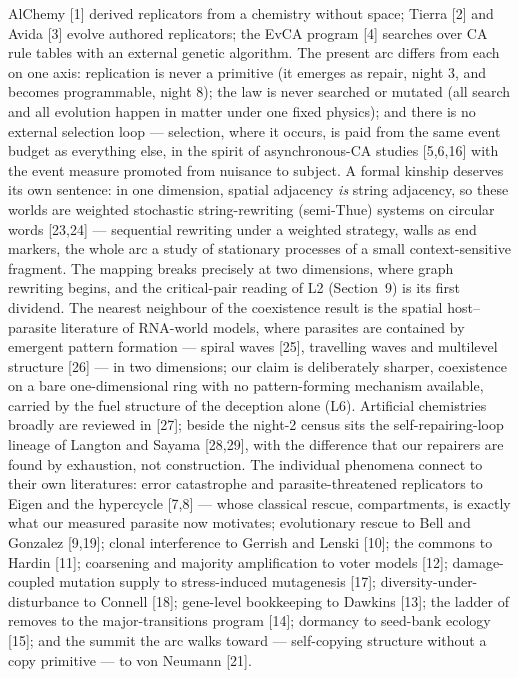 AlChemy [1] derived replicators from a chemistry without space;
Tierra [2] and Avida [3] evolve authored replicators; the EvCA
program [4] searches over CA rule tables with an external genetic
algorithm. The present arc differs from each on one axis:
replication is never a primitive (it emerges as repair, night 3,
and becomes programmable, night 8); the law is never searched or
mutated (all search and all evolution happen in matter under one
fixed physics); and there is no external selection loop ---
selection, where it occurs, is paid from the same event budget as
everything else, in the spirit of asynchronous-CA studies [5,6,16]
with the event measure promoted from nuisance to subject. A
formal kinship deserves its own sentence: in one dimension,
spatial adjacency {\it is} string adjacency, so these worlds are
weighted stochastic string-rewriting (semi-Thue) systems on
circular words [23,24] --- sequential rewriting under a weighted
strategy, walls as end markers, the whole arc a study of
stationary processes of a small context-sensitive fragment. The
mapping breaks precisely at two dimensions, where graph rewriting
begins, and the critical-pair reading of L2 (Section~9) is its
first dividend. The nearest neighbour of the coexistence result is
the spatial host--parasite literature of RNA-world models, where
parasites are contained by emergent pattern formation --- spiral
waves [25], travelling waves and multilevel structure [26] --- in
two dimensions; our claim is deliberately sharper, coexistence on
a bare one-dimensional ring with no pattern-forming mechanism
available, carried by the fuel structure of the deception alone
(L6). Artificial chemistries broadly are reviewed in [27]; beside
the night-2 census sits the self-repairing-loop lineage of Langton
and Sayama [28,29], with the difference that our repairers are
found by exhaustion, not construction. The individual phenomena
connect to their own literatures: error
catastrophe and parasite-threatened replicators to Eigen and the
hypercycle [7,8] --- whose classical rescue, compartments, is
exactly what our measured parasite now motivates; evolutionary
rescue to Bell and Gonzalez [9,19]; clonal interference to Gerrish
and Lenski [10]; the commons to Hardin [11]; coarsening and
majority amplification to voter models [12]; damage-coupled
mutation supply to stress-induced mutagenesis [17];
diversity-under-disturbance to Connell [18]; gene-level
bookkeeping to Dawkins [13]; the ladder of removes to the
major-transitions program [14]; dormancy to seed-bank ecology
[15]; and the summit the arc walks toward --- self-copying
structure without a copy primitive --- to von Neumann [21].

